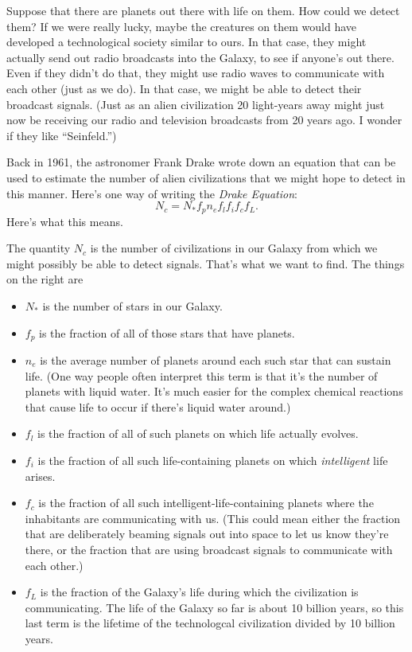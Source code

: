 Suppose that there are planets out there with life on them.  How could we
detect them?  If we were really lucky, maybe the creatures on them
would have developed a technological society similar to ours.  
In that case, they might actually send out radio broadcasts
into the Galaxy, to see if anyone's out there.  Even if they
didn't do that, 
they might use radio waves to communicate with each other (just 
as we do).  In that case, we
might be able to detect their broadcast signals.  (Just as an alien
civilization 20 light-years away might just now be receiving our radio
and television broadcasts from 20 years ago.  I wonder if they like
``Seinfeld.'')

Back in 1961, the astronomer Frank Drake wrote down an equation that
can be used to estimate the number of alien civilizations that we might
hope to detect in this manner.  Here's one way of writing the {\it
Drake Equation}:
$$
N_c=N_*f_pn_ef_lf_if_cf_L.
$$
Here's what this means.

The quantity $N_c$ is the number of civilizations in our Galaxy
from which we might possibly be able to detect signals.  That's what
we want to find.  The things on the right are
\begin{itemize}
\item $N_*$ is the number of stars in our Galaxy.
\item $f_p$ is the fraction of all of those stars that have planets.
\item $n_e$ is the average number of planets around each such star
that can sustain life.  (One way people often interpret this term
is that it's the number of planets with liquid water.  It's much
easier for the complex chemical reactions that cause life to occur
if there's liquid water around.)
\item $f_l$ is the fraction of all of such planets on which life actually
evolves.
\item $f_i$ is the fraction of all such life-containing planets on which
{\it intelligent} life arises.
\item $f_c$ is the fraction of all such intelligent-life-containing
planets where the inhabitants are communicating with us.  (This could mean
either the fraction that are deliberately beaming signals out into space
to let us know they're there, or the fraction that are using 
broadcast signals to communicate with each other.)
\item $f_L$ is the fraction of the Galaxy's life during which
the civilization is communicating.  The life of the Galaxy so far is
about 10 billion years, so this last term is the lifetime of the
technologcal civilization divided by 10 billion years.
\end{itemize}

